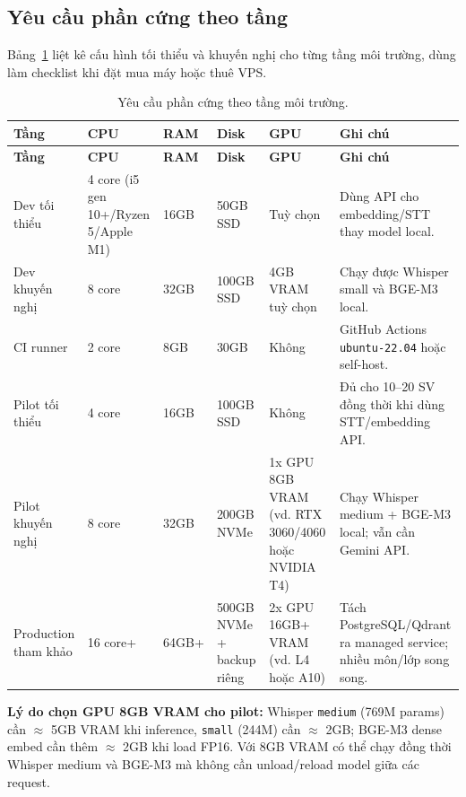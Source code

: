 \subsection{Yêu cầu phần cứng theo tầng}
\label{subsec:hardware-tiers}

Bảng~\ref{tab:hardware-tiers} liệt kê cấu hình tối thiểu và khuyến nghị
cho từng tầng môi trường, dùng làm checklist khi đặt mua máy hoặc thuê
VPS.

\begin{longtable}{|p{2.2cm}|p{1.6cm}|p{1.6cm}|p{2cm}|p{1.7cm}|p{3.3cm}|}
\caption{Yêu cầu phần cứng theo tầng môi trường.}
\label{tab:hardware-tiers} \\
\hline
\textbf{Tầng} & \textbf{CPU} & \textbf{RAM} & \textbf{Disk} & \textbf{GPU}
    & \textbf{Ghi chú} \\
\hline
\endfirsthead
\hline
\textbf{Tầng} & \textbf{CPU} & \textbf{RAM} & \textbf{Disk} & \textbf{GPU}
    & \textbf{Ghi chú} \\
\hline
\endhead

Dev tối thiểu & 4 core (i5 gen 10+/Ryzen 5/Apple M1) & 16GB & 50GB SSD
    & Tuỳ chọn & Dùng API cho embedding/STT thay model local. \\
\hline
Dev khuyến nghị & 8 core & 32GB & 100GB SSD & 4GB VRAM tuỳ chọn
    & Chạy được Whisper small và BGE-M3 local. \\
\hline
CI runner & 2 core & 8GB & 30GB & Không
    & GitHub Actions \texttt{ubuntu-22.04} hoặc self-host. \\
\hline
Pilot tối thiểu & 4 core & 16GB & 100GB SSD & Không
    & Đủ cho 10--20 SV đồng thời khi dùng STT/embedding API. \\
\hline
Pilot khuyến nghị & 8 core & 32GB & 200GB NVMe & 1x GPU 8GB VRAM
    (vd. RTX 3060/4060 hoặc NVIDIA T4)
    & Chạy Whisper medium + BGE-M3 local; vẫn cần Gemini API. \\
\hline
Production tham khảo & 16 core+ & 64GB+ & 500GB NVMe + backup riêng
    & 2x GPU 16GB+ VRAM (vd. L4 hoặc A10)
    & Tách PostgreSQL/Qdrant ra managed service; nhiều môn/lớp song
      song. \\
\hline
\end{longtable}

\textbf{Lý do chọn GPU 8GB VRAM cho pilot:} Whisper \texttt{medium}
(769M params) cần $\approx$ 5GB VRAM khi inference, \texttt{small}
(244M) cần $\approx$ 2GB; BGE-M3 dense embed cần thêm $\approx$ 2GB
khi load FP16. Với 8GB VRAM có thể chạy đồng thời Whisper medium và
BGE-M3 mà không cần unload/reload model giữa các request.

